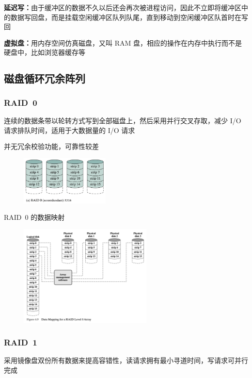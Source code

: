 \documentclass[cs4size,a4paper,10pt]{ctexart}
\begin{document}
	\textbf{延迟写：}由于缓冲区的数据不久以后还会再次被进程访问，因此不立即将缓冲区中的数据写回盘，而是挂载空闲缓冲区队列队尾，直到移动到空闲缓冲区队首时在写回

	\textbf{虚拟盘：}用内存空间仿真磁盘，又叫 RAM 盘，相应的操作在内存中执行而不是硬盘中，比如浏览器缓存等

	\subsection{磁盘循环冗余阵列}

	\subsubsection{RAID\ 0}
	连续的数据条带以轮转方式写到全部磁盘上，然后采用并行交叉存取，减少 I/O 请求排队时间，适用于大数据量的 I/O 请求

	并无冗余校验功能，可靠性较差
	\begin{figure}[H]
		\centering
		\includegraphics[width=0.4\textwidth]{img/RAID0}
	\end{figure}

	RAID\ 0 的数据映射
	\begin{figure}[H]
		\centering
		\includegraphics[width=0.6\textwidth]{img/RAID0-1}
	\end{figure}

	\subsubsection{RAID\ 1}
	采用镜像盘双份所有数据来提高容错性，读请求拥有最小寻道时间，写请求可并行完成
\end{document}
